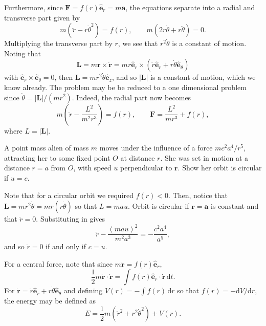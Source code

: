\documentclass[letter-paper]{tufte-book}
\newenvironment{example}[1][Example]{\begin{trivlist}
\item[\hskip \labelsep {\bfseries #1}]}{\end{trivlist}}
\newcommand{\ab}{\boldsymbol{a}}
\newcommand{\eb}{\boldsymbol{e}}
\newcommand{\Fb}{\boldsymbol{F}}
\newcommand{\Lb}{\boldsymbol{L}}
\newcommand{\rb}{\boldsymbol{r}}
\begin{document}
Furthermore, since $\Fb = f(r)\hat{\eb}_r = m\ab$, the equations separate into a
radial and transverse part given by
\begin{equation*}
  m(\ddot{r} - r\dot{\theta}^2) = f(r), \qquad
  m(2\dot{r}\dot{\theta} + r\ddot{\theta}) = 0.
\end{equation*}
Multiplying the transverse part by $r$, we see that $r^2\dot{\theta}$ is a
constant of motion. Noting that
\begin{equation*}
  \Lb = m\rb\times\dot{\rb} = mr\hat{\eb}_r \times(\dot{r}\hat{\eb}_r +
  r\dot{\theta}\hat{\eb}_\theta)
\end{equation*}
with $\hat{\eb}_r \times \hat{\eb}_\theta = 0$, then $\Lb =
mr^2\dot{\theta}\hat{\eb}_z$, and so $|\Lb|$ is a constant of motion, which we
know already. The problem may be be reduced to a one dimensional problem since
$\dot{\theta} = |\Lb|/(mr^2)$. Indeed, the radial part now becomes
\begin{equation*}
  m\left(\ddot{r} - \frac{L^2}{m^2 r^3}\right) = f(r), \qquad
  \Fb = \frac{L^2}{mr^3} + f(r),
\end{equation*}
where $L = |\Lb|$.

\begin{example}
  A point mass alien of mass $m$ moves under the influence of a force $mc^2a^4 /
  r^5$, attracting her to some fixed point $O$ at distance $r$. She was set in
  motion at a distance $r=a$ from $O$, with speed $u$ perpendicular to $\rb$.
  Show her orbit is circular if $u = c$.
  
  Note that for a circular orbit we required $f(r) < 0$. Then, notice that $\Lb
  = mr^2\dot{\theta} = mr(r\dot{\theta})$ so that $L = mau$. Orbit is circular
  if $\rb = \ab$ is constant and that $\ddot{r} = 0$. Substituting in gives
  \begin{equation*}
    \ddot{r} - \frac{(mau)^2}{m^2 a^3} = -\frac{c^2 a^4}{a^5},
  \end{equation*}
  and so $\ddot{r} = 0$ if and only if $c = u$.
\end{example}

For a central force, note that since $m\ddot{\rb} = f(r)\hat{\eb}_r$,
\begin{equation*}
  \frac{1}{2}m\dot{\rb}\cdot\dot{\rb} = \int f(r) \hat{\eb}_r \cdot \dot{\rb}\,
    \mathrm{d}t.
\end{equation*}
For $\dot{\rb} = \dot{r}\hat{\eb}_r + r\dot{\theta}\hat{\eb}_{\theta}$ and
defining $V(r) = -\int f(r)\, \mathrm{d}r$ so that $f(r) =
-\mathrm{d}V/\mathrm{d}r$, the energy may be defined as
\begin{equation*}
  E = \frac{1}{2} m\left(\dot{r}^2 + r^2\dot{\theta}^2\right) + V(r).
\end{equation*}
\end{document}
